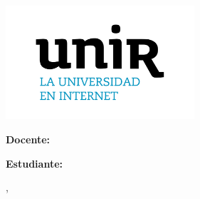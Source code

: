 \begin{titlepage}
	\centering
	\vspace*{1cm} %
	
	\includegraphics[width=7cm]{contenido/assets/Logo_UNIR}
	
	\vspace{1cm} %
	
	
	{\scshape\Huge \curso \par}
	\vspace{0.8cm} %
	
	{\Large\itshape\textbf{\titulotrabajo} \par}
	\vspace{2cm} %
	
	{\large\bfseries Docente: \par}
	{\large \docente \par}
	\vspace{1.2cm} %
	
	{\large\bfseries Estudiante: \par}
	{\large \nombreautor \par}
	\vspace{4cm} %
	
	{\large \lugar, \fecha \par}
	
	\vfill %
\end{titlepage}
